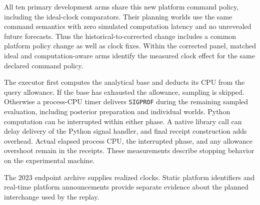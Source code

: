 \documentclass[preprint,12pt,authoryear]{elsarticle}
\begin{document}
All ten primary development arms share this new platform command policy,
including the ideal-clock comparators. Their planning worlds use the same command
semantics with zero simulated computation latency and no unrevealed future
forecasts. Thus the historical-to-corrected change includes a common platform
policy change as well as clock fixes. Within the corrected panel, matched ideal
and computation-aware arms identify the measured clock effect for the same
declared command policy.

The executor first computes the analytical base and deducts its CPU from the
query allowance. If the base has exhausted the allowance, sampling is skipped.
Otherwise a process-CPU timer delivers \texttt{SIGPROF} during the remaining
sampled evaluation, including posterior preparation and individual worlds.
Python computation can be interrupted within either phase. A native
library call can delay delivery of the Python signal handler, and final receipt
construction adds overhead. Actual elapsed process CPU, the interrupted phase,
and any allowance overshoot remain in the receipts. These measurements describe
stopping behavior on the experimental machine.


The 2023 endpoint archive supplies realized clocks. Static platform identifiers
and real-time platform announcements provide separate evidence about the
planned interchange used by the replay.
\end{document}
